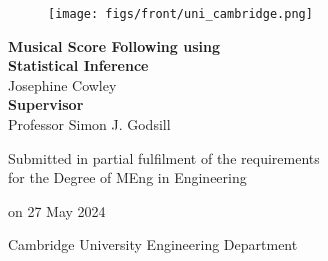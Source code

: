\newcommand{\condBreak}[1]{\ifx#1\empty\else \\ \fi }


\begin{titlepage}
    \begin{center}
        \vspace*{0.3in}
        
        \begin{figure}[H]
            \centering
            \texttt{[image: figs/front/uni\_cambridge.png]}
        \end{figure}

        \vspace{0.5in}

        {\Huge \bf Musical Score Following using} \\
        \vspace*{.08in}
        {\Huge \bf Statistical Inference} \\
        \vspace*{.3in}
        {\Large{Josephine Cowley}} \\
        \vspace{0.2in}
        {\textbf{Supervisor} \\
                    Professor Simon J. Godsill            
                }
    
        \vspace{0.8in}

        {Submitted in partial fulfilment of the requirements
            \\for the Degree of MEng in Engineering}

        {on 27 May 2024 \\}

        \vspace{1.5in}

        {Cambridge University Engineering Department}

    \end{center}
\end{titlepage}